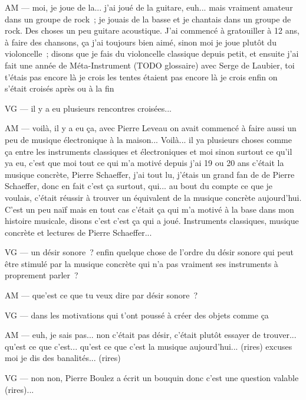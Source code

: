 AM — moi, je joue de la... j'ai joué de la guitare, euh... mais vraiment amateur dans un groupe de rock ; je jouais de la basse et je chantais dans un groupe de rock. Des choses un peu guitare acoustique. J'ai commencé à gratouiller à 12 ans, à faire des chansons, ça j'ai toujours bien aimé, sinon moi je joue plutôt du violoncelle ; disons que je fais du violoncelle classique depuis petit, et ensuite j'ai fait une année de Méta-Instrument (TODO glossaire) avec Serge de Laubier, toi t'étais pas encore là je crois les tentes étaient pas encore là je crois enfin on s'était croisés après ou à la fin 

VG — il y a eu plusieurs rencontres croisées... 

AM — voilà, il y a eu ça, avec Pierre Leveau on avait commencé à faire aussi un peu de musique électronique à la maison... Voilà... il ya plusieurs choses comme ça entre les instruments classiques et électroniques et moi sinon surtout ce qu'il ya eu, c'est que moi tout ce qui m'a motivé depuis j'ai 19 ou 20 ans c'était la musique concrète, Pierre Schaeffer, j'ai tout lu, j'étais un grand fan de de Pierre Schaeffer, donc en fait c'est ça surtout, qui... au bout du compte ce que je voulais, c'était réussir à trouver un équivalent de la musique concrète aujourd'hui. C'est un peu naïf mais en tout cas c'était ça qui m'a motivé à la base dans mon histoire musicale, disons c'est c'est ça qui a joué. Instruments classiques, musique concrète et lectures de Pierre Schaeffer... 

VG — un désir sonore ? enfin quelque chose de l'ordre du désir sonore qui peut être stimulé par la musique concrète qui n'a pas vraiment ses instruments à proprement parler ?

AM — que'est ce que tu veux dire par désir sonore ?

VG — dans les motivations qui t'ont poussé à créer des objets comme ça 

AM — euh, je sais pas... non c'était pas désir, c'était plutôt essayer de trouver... qu'est ce que c'est... qu'est ce que c'est la musique aujourd'hui... (rires) excuses moi je dis des banalités... (rires)

VG — non non, Pierre Boulez a écrit un bouquin donc c'est une question valable (rires)... 

